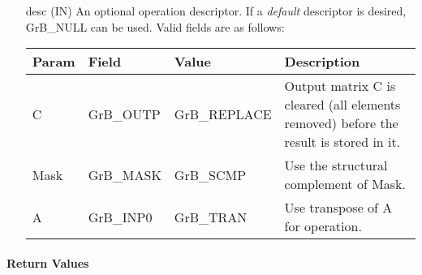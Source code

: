 \begin{itemize}[leftmargin=1in]
    \item[{\sf desc}]     ({\sf IN}) An optional operation descriptor.  If a 
    \emph{default} descriptor is desired, {\sf GrB\_NULL} can be used.  Valid 
    fields are as follows: \\
    
    \begin{tabular}{lllp{2.5in}}
        Param & Field  & Value & Description \\
        \hline
        {\sf C}    & {\sf GrB\_OUTP} & {\sf GrB\_REPLACE} & Output matrix {\sf C}
        is cleared (all elements removed) before the result is stored in it. \\
        
        {\sf Mask} & {\sf GrB\_MASK} & {\sf GrB\_SCMP}   & Use the structural 
        complement of {\sf Mask}. \\

	{\sf A}	   & {\sf GrB\_INP0} & {\sf GrB\_TRAN}   & Use transpose of {\sf A} for operation.
    \end{tabular}
\end{itemize}

\paragraph{Return Values}

